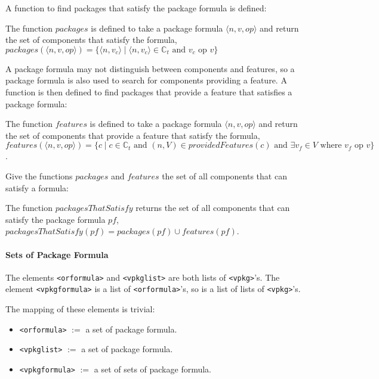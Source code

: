 A function to find packages that satisfy the package formula is defined:
\begin{defs}
The function $packages$ is defined to take a package formula $\langle n,v,op\rangle$ and return the set of components that satisfy the formula,
$packages(\langle n,v,op\rangle) = \{\langle n,v_c \rangle \mid \langle n,v_c \rangle \in \mathbb{C}_t \mbox{ and } v_c \mbox{ op } v\}$
\end{defs}

A package formula may not distinguish between components and features, so a package formula is also used to search for components providing a feature.
A function is then defined to find packages that provide a feature that satisfies a package formula:
\begin{defs}
The function $features$ is defined to take a package formula $\langle n,v,op\rangle$ and return the set of components that provide a feature that satisfy the formula,
$features(\langle n,v,op\rangle) = \{c \mid c \in \mathbb{C}_t \mbox{ and } (n,V) \in providedFeatures(c) \mbox{ and } \exists v_f \in V \mbox { where } v_f \mbox{ op } v \}$.
\end{defs}

Give the functions $packages$ and $features$ the set of all components that can satisfy a formula:
\begin{defs}
The function $packagesThatSatisfy$ returns the set of all components that can satisfy the package formula $pf$, $packagesThatSatisfy(pf) = packages(pf) \cup features(pf)$.
\end{defs}

\paragraph{Sets of Package Formula}
The elements \texttt{<orformula>} and \texttt{<vpkglist>} are both lists of \texttt{<vpkg>}'s.
The element \texttt{<vpkgformula>} is a list of \texttt{<orformula>}'s, so is a list of lists of \texttt{<vpkg>}'s.

The mapping of these elements is trivial:
\begin{itemize}
  \item \texttt{<orformula>} $ := $ a set of package formula.
  \item \texttt{<vpkglist>} $ := $ a set of package formula.
  \item \texttt{<vpkgformula>} $ := $ a set of sets of package formula.
\end{itemize}

